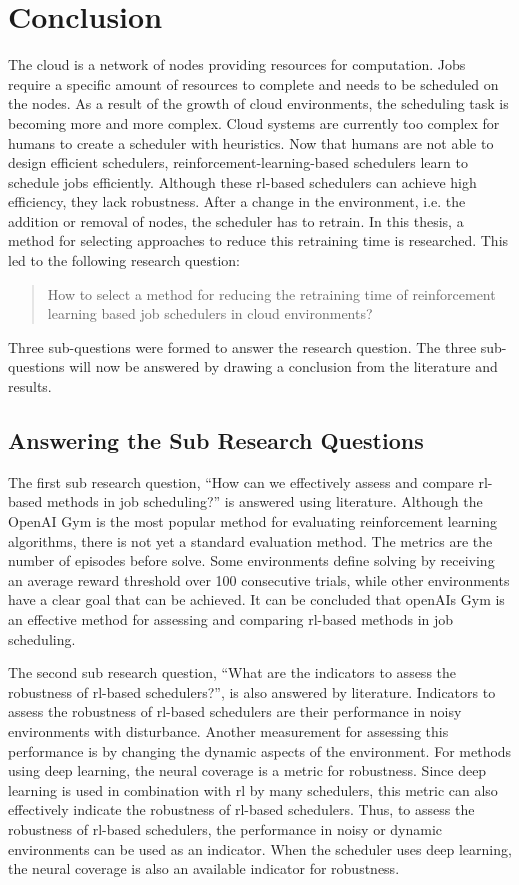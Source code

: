 \chapter{Conclusion}\label{sec:conclusion}

The cloud is a network of nodes providing resources for computation. Jobs
require a specific amount of resources to complete and needs to be scheduled
on the nodes. As a result of the growth of cloud environments, the scheduling
task is becoming more and more complex. Cloud systems are currently too
complex for humans to create a scheduler with heuristics. Now that humans are
not able to design efficient schedulers, reinforcement-learning-based
schedulers learn to schedule jobs efficiently. Although these \gls{rl}-based
schedulers can achieve high efficiency, they lack robustness. After a change
in the environment, i.e. the addition or removal of nodes, the scheduler has
to retrain. In this thesis, a method for selecting approaches to reduce this
retraining time is researched. This led to the following research question:
\begin{quote}
How to select a method for reducing the retraining time of reinforcement learning
    based job schedulers in cloud environments?
\end{quote}
Three sub-questions were formed to answer the research question. The three
sub-questions will now be answered by drawing a conclusion from the literature
and results.


\section{Answering the Sub Research Questions}

The first sub research question, ``How can we effectively assess and compare
\gls{rl}-based methods in job scheduling?'' is answered using literature. Although
the OpenAI Gym is the most popular method for evaluating reinforcement
learning algorithms, there is not yet a standard evaluation method. The
metrics are the number of episodes before solve. Some environments define
solving by receiving an average reward threshold over 100 consecutive trials,
while other environments have a clear goal that can be achieved. It can be
concluded that openAIs Gym is an effective method for assessing and comparing
\gls{rl}-based methods in job scheduling.

The second sub research question, ``What are the indicators to assess the
robustness of \gls{rl}-based schedulers?'', is also answered by literature.
Indicators to assess the robustness of \gls{rl}-based schedulers are their performance
in noisy environments with disturbance. Another measurement for
assessing this performance is by changing the dynamic aspects of the
environment. For methods using deep learning, the neural coverage is a metric
for robustness. Since deep learning is used in combination with \gls{rl} by many
schedulers, this metric can also effectively indicate the robustness of
\gls{rl}-based
schedulers. Thus, to assess the robustness of \gls{rl}-based schedulers, the performance
in noisy or dynamic environments can be used as an indicator. When the scheduler
uses deep learning, the neural coverage is also an available indicator for
robustness.


